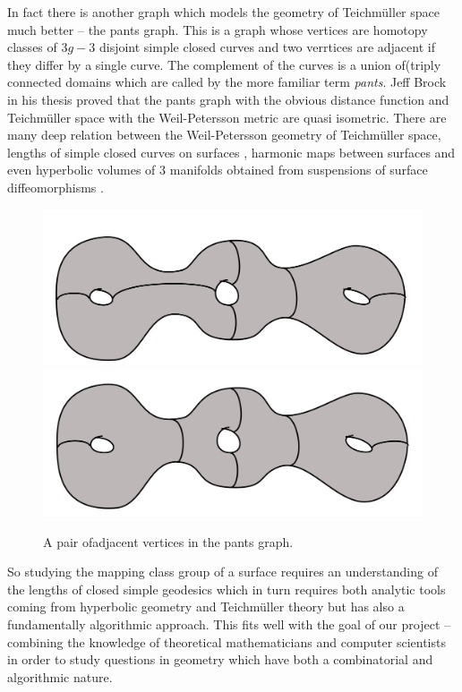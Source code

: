 \documentclass[14pt,fleqn]{article}
\begin{document}
In fact there is another graph which models the geometry of Teichm\"uller space much better -- the pants graph. This is a graph whose vertices are homotopy classes of
$3g-3$ disjoint simple closed curves    and two verrtices are adjacent if they differ by a single curve.
The complement of the curves is a union of(triply connected domains which are called by the more familiar term \textit{pants}. Jeff Brock in his thesis proved that the pants graph with the obvious distance function and Teichm\"uller space with the Weil-Petersson metric are quasi isometric.
There are many deep relation between the 
Weil-Petersson geometry of Teichm\"uller space, 
lengths of simple closed curves on surfaces 
\cite{bridgeman2019uniform},
harmonic maps between surfaces \cite{wolf}
and even hyperbolic volumes of 3 manifolds obtained from  suspensions of surface diffeomorphisms \cite{km-nevvp-18}. 

\begin{figure}[H]
  \centering
  \subfloat  
{\includegraphics[scale=.2]{IMG_5383.jpg} 
}
 \hfill
  \subfloat
  {\includegraphics[scale=.2]{IMG_5385.jpg} 
}

{\small A pair ofadjacent vertices in the pants graph.}

\end{figure} 


So studying the mapping class group of a surface 
requires 
an understanding 
of the lengths of closed simple geodesics
which in turn 
requires both analytic tools
coming from hyperbolic geometry and Teichmüller theory 
but has also a fundamentally
algorithmic approach.
This fits well with the  goal of our project -- combining the knowledge of theoretical
mathematicians and computer scientists in order to study questions in
geometry
which have both a combinatorial and algorithmic nature.  
\end{document}
